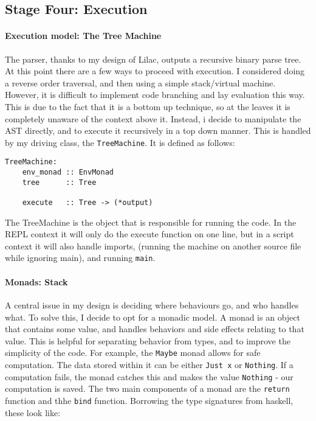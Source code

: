 \documentclass[11pt]{article}
\begin{document}
\hypertarget{stage-four-execution}{%
\subsection{Stage Four: Execution}\label{stage-four-execution}}

\hypertarget{execution-model-the-tree-machine}{%
\paragraph{Execution model: The Tree
Machine}\label{execution-model-the-tree-machine}}

The parser, thanks to my design of Lilac, outputs a recursive binary
parse tree. At this point there are a few ways to proceed with
execution. I considered doing a reverse order traversal, and then using
a simple stack/virtual machine. However, it is difficult to implement
code branching and lay evaluation this way. This is due to the fact that
it is a bottom up technique, so at the leaves it is completely unaware
of the context above it. Instead, i decide to manipulate the AST
directly, and to execute it recursively in a top down manner. This is
handled by my driving class, the \texttt{TreeMachine}. It is defined as
follows:

\begin{verbatim}
TreeMachine:
    env_monad :: EnvMonad
    tree      :: Tree
    
    execute   :: Tree -> (*output)
\end{verbatim}

The TreeMachine is the object that is responsible for running the code.
In the REPL context it will only do the execute function on one line,
but in a script context it will also handle imports, (running the
machine on another source file while ignoring main), and running
\texttt{main}.

\hypertarget{monads-stack}{%
\paragraph{Monads: Stack}\label{monads-stack}}

A central issue in my design is deciding where behaviours go, and who
handles what. To solve this, I decide to opt for a monadic model. A
monad is an object that contains some value, and handles behaviors and
side effects relating to that value. This is helpful for separating
behavior from types, and to improve the simplicity of the code. For
example, the \texttt{Maybe} monad allows for safe computation. The data
stored within it can be either \texttt{Just\ x} or \texttt{Nothing}. If
a computation fails, the monad catches this and makes the value
\texttt{Nothing} - our computation is saved. The two main components of
a monad are the \texttt{return} function and thhe \texttt{bind}
function. Borrowing the type signatures from haskell, these look like:
\end{document}
